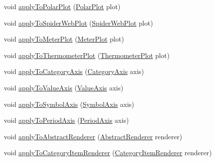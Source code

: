 \begin{DoxyCompactItemize}
\item 
void \mbox{\hyperlink{classorg_1_1jfree_1_1chart_1_1_standard_chart_theme_a1b04db2c709cb58872986a484f61a7a4}{apply\+To\+Polar\+Plot}} (\mbox{\hyperlink{classorg_1_1jfree_1_1chart_1_1plot_1_1_polar_plot}{Polar\+Plot}} plot)
\item 
void \mbox{\hyperlink{classorg_1_1jfree_1_1chart_1_1_standard_chart_theme_a2439220f7a9c614524d4e2a5e179c45f}{apply\+To\+Spider\+Web\+Plot}} (\mbox{\hyperlink{classorg_1_1jfree_1_1chart_1_1plot_1_1_spider_web_plot}{Spider\+Web\+Plot}} plot)
\item 
void \mbox{\hyperlink{classorg_1_1jfree_1_1chart_1_1_standard_chart_theme_ace0e9b68253031b41f6084f965924264}{apply\+To\+Meter\+Plot}} (\mbox{\hyperlink{classorg_1_1jfree_1_1chart_1_1plot_1_1_meter_plot}{Meter\+Plot}} plot)
\item 
void \mbox{\hyperlink{classorg_1_1jfree_1_1chart_1_1_standard_chart_theme_a4fbb7941f2e566248f5d0f0184781ac5}{apply\+To\+Thermometer\+Plot}} (\mbox{\hyperlink{classorg_1_1jfree_1_1chart_1_1plot_1_1_thermometer_plot}{Thermometer\+Plot}} plot)
\item 
void \mbox{\hyperlink{classorg_1_1jfree_1_1chart_1_1_standard_chart_theme_a33a09f7ec5cac2433b2d59289a00bb17}{apply\+To\+Category\+Axis}} (\mbox{\hyperlink{classorg_1_1jfree_1_1chart_1_1axis_1_1_category_axis}{Category\+Axis}} axis)
\item 
void \mbox{\hyperlink{classorg_1_1jfree_1_1chart_1_1_standard_chart_theme_a84a8a64bcf42fb6ceb2eea2a61538cfa}{apply\+To\+Value\+Axis}} (\mbox{\hyperlink{classorg_1_1jfree_1_1chart_1_1axis_1_1_value_axis}{Value\+Axis}} axis)
\item 
void \mbox{\hyperlink{classorg_1_1jfree_1_1chart_1_1_standard_chart_theme_a06eaca40142ac15fde415291e7565771}{apply\+To\+Symbol\+Axis}} (\mbox{\hyperlink{classorg_1_1jfree_1_1chart_1_1axis_1_1_symbol_axis}{Symbol\+Axis}} axis)
\item 
void \mbox{\hyperlink{classorg_1_1jfree_1_1chart_1_1_standard_chart_theme_ad5633c7b4317d17c2fbcd031021a8694}{apply\+To\+Period\+Axis}} (\mbox{\hyperlink{classorg_1_1jfree_1_1chart_1_1axis_1_1_period_axis}{Period\+Axis}} axis)
\item 
void \mbox{\hyperlink{classorg_1_1jfree_1_1chart_1_1_standard_chart_theme_a2c51b14e868c9077144b31845c157ad2}{apply\+To\+Abstract\+Renderer}} (\mbox{\hyperlink{classorg_1_1jfree_1_1chart_1_1renderer_1_1_abstract_renderer}{Abstract\+Renderer}} renderer)
\item 
void \mbox{\hyperlink{classorg_1_1jfree_1_1chart_1_1_standard_chart_theme_aa91e56f7c362dd237a215fefd6bf0a69}{apply\+To\+Category\+Item\+Renderer}} (\mbox{\hyperlink{interfaceorg_1_1jfree_1_1chart_1_1renderer_1_1category_1_1_category_item_renderer}{Category\+Item\+Renderer}} renderer)

\end{DoxyCompactItemize}
